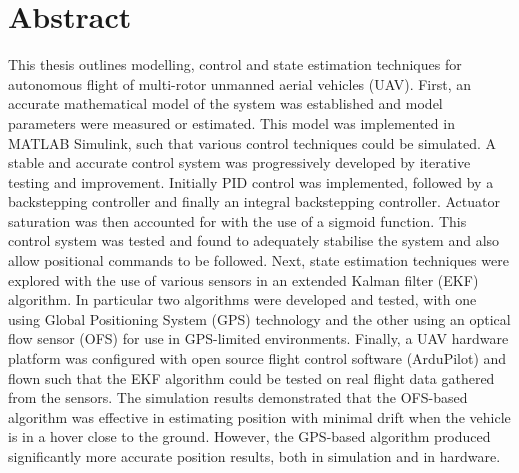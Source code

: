 
\chapter*{Abstract}\label{Abstract}
This thesis outlines modelling, control and state estimation techniques for autonomous flight of multi-rotor unmanned aerial vehicles (UAV). First, an accurate mathematical model of the system was established and model parameters were measured or estimated. This model was implemented in MATLAB Simulink, such that various control techniques could be simulated. A stable and accurate control system was progressively developed by iterative testing and improvement. Initially PID control was implemented, followed by a backstepping controller and finally an integral backstepping controller. Actuator saturation was then accounted for with the use of a sigmoid function. This control system was tested and found to adequately stabilise the system and also allow positional commands to be followed. Next, state estimation techniques were explored with the use of various sensors in an extended Kalman filter (EKF) algorithm. In particular two algorithms were developed and tested, with one using Global Positioning System (GPS) technology and the other using an optical flow sensor (OFS) for use in GPS-limited environments. Finally, a UAV hardware platform was configured with open source flight control software (ArduPilot) and flown such that the EKF algorithm could be tested on real flight data gathered from the sensors. The simulation results demonstrated that the OFS-based algorithm was effective in estimating position with minimal drift when the vehicle is in a hover close to the ground. However, the GPS-based algorithm produced significantly more accurate position results, both in simulation and in hardware. 
\clearpage


